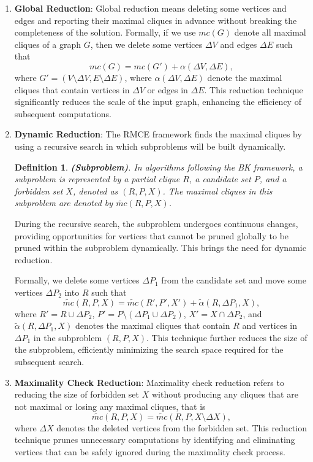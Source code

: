 \documentclass[sigconf, nonacm]{acmart}
\newtheorem{definition}{Definition}%
\begin{document}
\begin{enumerate}[leftmargin=0.5cm, itemindent=0cm]
    \item \textbf{Global Reduction}: Global reduction means deleting some vertices and edges and reporting their maximal cliques in advance without breaking the completeness of the solution. Formally, if we use $mc(G)$ denote all maximal cliques of a graph $G$, then we delete some vertices $\Delta V$ and edges $\Delta E$ such that 
    $$mc(G) = mc(G') + \alpha(\Delta V, \Delta E),$$ 
    where $G'=(V\setminus \Delta V, E\setminus \Delta E)$, where $ \alpha(\Delta V, \Delta E)$ denote the maximal cliques that contain vertices in $\Delta V$ or edges in $\Delta E$. 
    This reduction technique significantly reduces the scale of the input graph, enhancing the efficiency of subsequent computations.
    \item \textbf{Dynamic Reduction}: The RMCE framework finds the maximal cliques by using a recursive search in which subproblems will be built dynamically. 
    \begin{definition}
        \textit{\textbf{(Subproblem)}. 
    In algorithms following the BK framework, a subproblem is represented by a partial clique $R$, a candidate set $P$, and a forbidden set $X$, denoted as $(R,P,X)$. The maximal cliques in this subproblem are denoted by $\tilde{mc}(R,P,X)$.
        }
    \end{definition}
    During the recursive search, the subproblem undergoes continuous changes, providing opportunities for vertices that cannot be pruned globally to be pruned within the subproblem dynamically. This brings the need for dynamic reduction.
    
    
    Formally, we delete some vertices $\Delta P_1$ from the candidate set and move some vertices $\Delta P_2$ into $R$ such that 
    {%
    $$\tilde{mc}(R,P,X) = \tilde{mc}(R',P',X') + \tilde{\alpha}(R,\Delta P_1,X),$$}
    where $R'=R\cup \Delta P_2$, $P'=P\setminus (\Delta P_1\cup \Delta P_2 )$, $X'=X\cap \Delta P_2$, and $\tilde{\alpha}(R,\Delta P_1,X)$ denotes the maximal cliques that contain $R$ and vertices in $\Delta P_1$ in the subproblem $(R,P,X)$. 
    This technique further reduces the size of the subproblem, efficiently minimizing the search space required for the subsequent search.

    \item \textbf{Maximality Check Reduction}: Maximality check reduction refers to reducing the size of forbidden set $X$ without producing any cliques that are not maximal or losing any maximal cliques, that is 
    $$\tilde{mc}(R,P,X) = \tilde{mc}(R,P,X\setminus \Delta X),$$
    where $\Delta X$ denotes the deleted vertices from the forbidden set. This reduction technique prunes unnecessary computations by identifying and eliminating vertices that can be safely ignored during the maximality check process.
    \end{enumerate}
\end{document}
